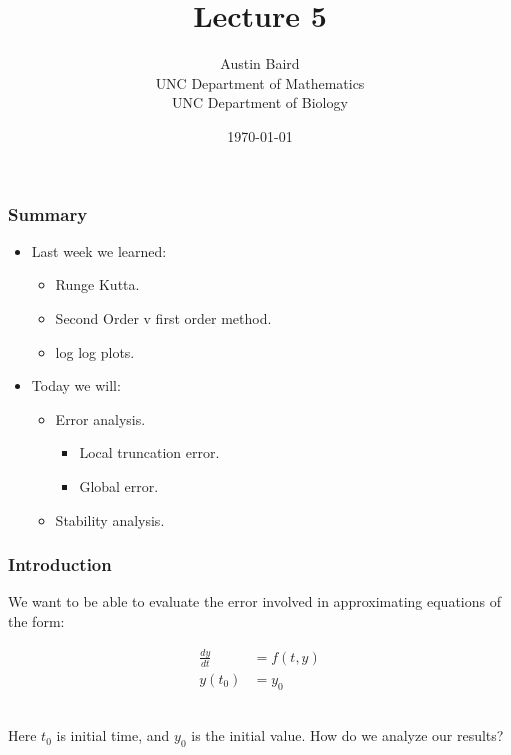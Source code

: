 \documentclass{beamer}
\title{Lecture 5}
\author{Austin Baird\\UNC Department of Mathematics\\UNC Department of Biology}
\date{\today}
\begin{document}
\frame{\titlepage}

\begin{frame}
\frametitle{Summary}
\begin{itemize}

\item Last week we learned: 
\begin{itemize}
\item Runge Kutta.  
\item Second Order v first order method.
\item log log plots.
\end{itemize}
\item Today we will: 
\begin{itemize}
\item Error analysis.
\begin{itemize}
\item Local truncation error.
\item Global error.
\end{itemize}
\item Stability analysis.
\end{itemize}
\end{itemize}

\end{frame}

\begin{frame}
\frametitle{Introduction}

We want to be able to evaluate the error involved in approximating equations of the form: 

\begin{align*}
\frac{dy}{dt} &= f(t,y)\\
y(t_0) &= y_0
\end{align*}

\ \\

Here $t_0$ is initial time, and $y_0$ is the initial value. How do we analyze our results? 
\end{frame}
\end{document}
